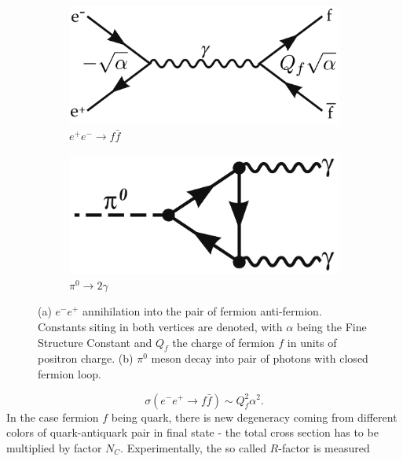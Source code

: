 \begin{figure}[t]
  \centering
  \begin{subfigure}[b]{0.45\textwidth}
    \includegraphics[width=\textwidth]{Chapter1/RRatio.png} 
    \caption{$e^+e^- \rightarrow f\bar{f}$}
    \label{fig:RRatio}
  \end{subfigure}
  \quad
  \begin{subfigure}[b]{0.45\textwidth}
    \includegraphics[width=\textwidth]{Chapter1/PiMesonDecay.png}
    \caption{$\pi^0 \rightarrow 2 \gamma$}
    \label{fig:PiDecay}
  \end{subfigure}
  \caption{(a) $e^-e^+$ annihilation into the pair of fermion anti-fermion.
    Constants siting in both vertices are denoted, with $\alpha$ being the Fine
    Structure Constant and $Q_f$ the charge of fermion $f$ in units of positron
    charge.
           (b) $\pi^0$ meson decay into pair of photons with closed fermion
         loop.}
  \label{fig:FeynmannGraphsNC3}
\end{figure}

\begin{equation}
  \sigma (e^- e^+ \rightarrow f \bar{f} ) \sim Q_f^2 \alpha^2.
  \label{eq:NumberOfColorsBasicCrossSection}
\end{equation}
In the case fermion $f$ being quark, there is new degeneracy coming from
different colors of quark-antiquark pair in final state - the total cross
section has to be multiplied by factor $N_C$. Experimentally, the so called
$R$-factor is measured


